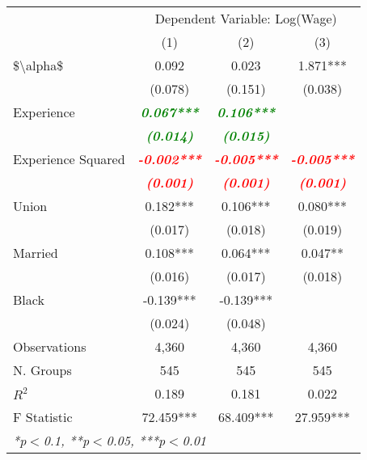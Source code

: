 

\begin{table}[!ht]
  \centering
\begin{tabular}{lccc}
  \toprule
  \toprule
  & \multicolumn{3}{c}{Dependent Variable: Log(Wage)} \\
  \cmidrule(lr){2-4}
   &   (1) & (2) & (3)\\
  \midrule
  \$\textbackslash alpha\$ & 0.092 & 0.023 & 1.871*** \\
   & (0.078) & (0.151) & (0.038) \\
  Experience & \textbf{\textit{\textcolor{green}{ 0.067***}}} & \textbf{\textit{\textcolor{green}{ 0.106***}}} &  \\
   & \textbf{\textit{\textcolor{green}{(0.014)}}} & \textbf{\textit{\textcolor{green}{(0.015)}}} &  \\
  Experience Squared & \textbf{\textit{\textcolor{red}{-0.002***}}} & \textbf{\textit{\textcolor{red}{-0.005***}}} & \textbf{\textit{\textcolor{red}{-0.005***}}} \\
   & \textbf{\textit{\textcolor{red}{(0.001)}}} & \textbf{\textit{\textcolor{red}{(0.001)}}} & \textbf{\textit{\textcolor{red}{(0.001)}}} \\
  Union & 0.182*** & 0.106*** & 0.080*** \\
   & (0.017) & (0.018) & (0.019) \\
  Married & 0.108*** & 0.064*** & 0.047** \\
   & (0.016) & (0.017) & (0.018) \\
  Black & -0.139*** & -0.139*** &  \\
   & (0.024) & (0.048) &  \\
  \midrule
  Observations & 4,360 & 4,360 & 4,360 \\
  N. Groups & 545 & 545 & 545 \\
  $R^2$ & 0.189 & 0.181 & 0.022 \\
  F Statistic & 72.459*** & 68.409*** & 27.959*** \\
  \bottomrule
  \multicolumn{4}{l}{{\small \textit{*p$<$0.1, **p$<$0.05, ***p$<$0.01}}}\\
\end{tabular}
\end{table}
